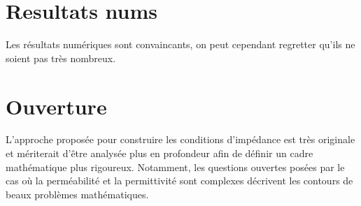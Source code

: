 \documentclass{article}
\begin{document}
\section{Resultats nums}
\begin{cite}
    Les résultats numériques sont convaincants, on peut cependant regretter qu’ils ne soient pas très nombreux.
\end{cite}

\section{Ouverture}
\begin{cite}
    L’approche proposée pour construire les conditions d’impédance est très originale et mériterait d’être analysée plus en profondeur afin de définir un cadre mathématique
plus rigoureux.
    Notamment, les questions ouvertes posées par le cas où la perméabilité et la permittivité sont complexes décrivent les contours de beaux problèmes mathématiques.
\end{cite}
\end{document}
